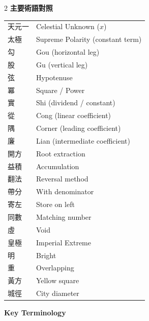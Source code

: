 \documentclass[11pt,a4paper]{article}
\newcommand{\cnpar}[1]{{\tradfont #1\par}}
\begin{document}
\begin{paracol}{2}
\noindent\textbf{主要術語對照}

\cnpar{%
\begin{tabular}{ll}
天元一 & Celestial Unknown ($x$) \\
太極 & Supreme Polarity (constant term) \\
勾 & Gou (horizontal leg) \\
股 & Gu (vertical leg) \\
弦 & Hypotenuse \\
冪 & Square / Power \\
實 & Shi (dividend / constant) \\
從 & Cong (linear coefficient) \\
隅 & Corner (leading coefficient) \\
廉 & Lian (intermediate coefficient) \\
開方 & Root extraction \\
益積 & Accumulation \\
翻法 & Reversal method \\
帶分 & With denominator \\
寄左 & Store on left \\
同數 & Matching number \\
虛 & Void \\
皇極 & Imperial Extreme \\
明 & Bright \\
重 & Overlapping \\
黃方 & Yellow square \\
城徑 & City diameter \\
\end{tabular}}

\switchcolumn

\noindent\textbf{Key Terminology}


\end{paracol}
\end{document}
